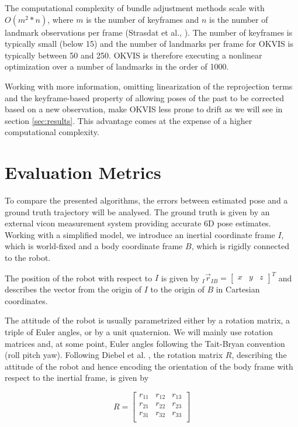 The computational complexity of bundle adjustment methods scale with $O(m^2*n)$, where $m$ is the number of keyframes and $n$ is the number of landmark observations per frame (Strasdat et al., \cite{strasdat2010real}). The number of keyframes is typically small (below 15) and the number of landmarks per frame for OKVIS is typically between 50 and 250. OKVIS is therefore executing a nonlinear optimization over a number of landmarks in the order of 1000. 

Working with more information, omitting linearization of the reprojection terms and the keyframe-based property of allowing poses of the past to be corrected based on a new observation, make OKVIS less prone to drift as we will see in section \ref{sec:results}. This advantage comes at the expense of a higher computational complexity.



\section{Evaluation Metrics}
\label{sec:metrics}

To compare the presented algorithms, the errors between estimated pose and a ground truth trajectory will be analysed. The ground truth is given by an external vicon measurement system providing accurate 6D pose estimates. Working with a simplified model, we introduce an inertial coordinate frame $I$, which is world-fixed and a body coordinate frame $B$, which is rigidly connected to the robot. 

The position of the robot with respect to $I$ is given by $_I \vec{r}_{IB} = \left[ \begin{array}{ccc} x& y& z \end{array} \right]^T$ and describes the vector from the origin of $I$ to the origin of $B$ in Cartesian coordinates. 

The attitude of the robot is usually parametrized either by a rotation matrix, a triple of Euler angles, or by a unit quaternion. We will mainly use rotation matrices and, at some point, Euler angles following the Tait-Bryan convention (roll pitch yaw). Following Diebel et al. \cite{diebel2006representing}, the rotation matrix $R$, describing the attitude of the robot and hence encoding the orientation of the body frame with respect to the inertial frame, is given by 

\begin{equation}
       R = \left[ \begin{array}{ccc}
		r_{11} & r_{12}	& r_{13} \\
		r_{21} & r_{22} 	& r_{23} \\
		r_{31} & r_{32}	& r_{33} \\
		\end{array} \right]
\end{equation}

